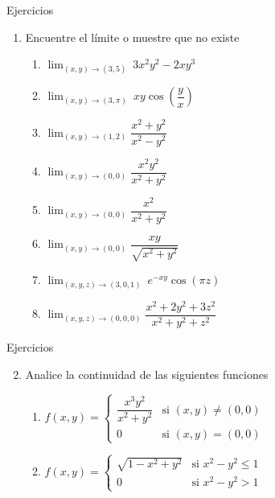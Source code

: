 \begin{frame}{Ejercicios}
  \begin{enumerate}
    \item Encuentre el límite o muestre que no existe\\[0.25cm]
    \begin{enumerate}
      \item $\displaystyle\lim_{(x,y)\to(3,5)}\ 3x^2y^2-2xy^3$
      \item $\displaystyle\lim_{(x,y)\to(3,\pi)}\ xy\cos\left(\dfrac{y}{x}\right)$
      \item $\displaystyle\lim_{(x,y)\to(1,2)}\dfrac{x^2+y^2}{x^2-y^2}$
      \item $\displaystyle\lim_{(x,y)\to(0,0)}\dfrac{x^2y^2}{x^2+y^2}$
      \item $\displaystyle\lim_{(x,y)\to(0,0)}\dfrac{x^2}{x^2+y^2}$
      \item $\displaystyle\lim_{(x,y)\to(0,0)}\dfrac{xy}{\sqrt{x^2+y^2}}$
      \item $\displaystyle\lim_{(x,y,z)\to(3,0,1)}\ e^{-xy}\cos(\pi z)$
      \item $\displaystyle\lim_{(x,y,z)\to(0,0,0)}\dfrac{x^2+2y^2+3z^2}{x^2+y^2+z^2}$
    \end{enumerate}
  \end{enumerate}
\end{frame}

\begin{frame}{Ejercicios}
  \begin{enumerate}
    \setcounter{enumi}{1}
    \item Analice la continuidad de las siguientes funciones\\[0.25cm]
    \begin{enumerate}
      \item $f(x,y)=\left\{\begin{array}{cl}
        \dfrac{x^3y^2}{x^2+y^2} & \text{si } (x,y)\neq(0,0)\\
        0 & \text{si } (x,y)=(0,0)
      \end{array}\right.$\\[0.25cm]
      \item $f(x,y)=\left\{\begin{array}{cl}
        \sqrt{1-x^2+y^2} & \text{si } x^2-y^2\leq 1\\
        0 & \text{si } x^2-y^2>1
      \end{array}\right.$
    \end{enumerate}
  \end{enumerate}
\end{frame}

